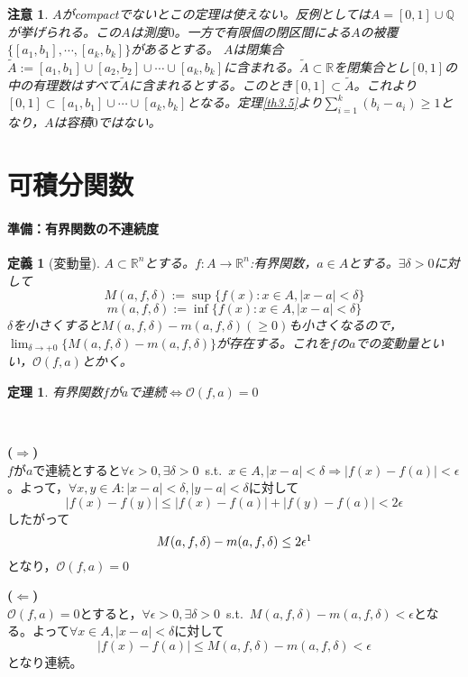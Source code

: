 \documentclass[dvipdfmx,a4j,10pt]{jsarticle}
\makeatletter
\theoremstyle{mystyle1}
\theoremstyle{mystyle2}
\newtheorem{dfn*}{定義}
\newtheorem{thm*}{定理}
\newtheorem{note}{注意}
\renewenvironment{proof}[1][\proofname]{\par
  \pushQED{\qed}%
  \normalfont
  \topsep6\p@\@plus6\p@ \trivlist
  \item[\hskip\labelsep{\bfseries\sffamily #1}]\ignorespaces
}{%
  \popQED\endtrivlist\@endpefalse
}
\renewcommand\proofname{証明}
\makeatother
\begin{document}
\begin{note}
	$A$がcompactでないとこの定理は使えない。反例としては$A=[0,1]\cup\mathbb{Q}$が挙げられる。この$A$は測度$0$。一方で有限個の閉区間による$A$の被覆$\{[a_1,b_1],\cdots,[a_k,b_k]\}$があるとする。
	$A$は閉集合$\tilde{A}:=[a_1,b_1]\cup[a_2,b_2]\cup\cdots\cup[a_k,b_k]$に含まれる。$\tilde{A}\subset\mathbb{R}$を閉集合とし$[0,1]$の中の有理数はすべて$\tilde{A}$に含まれるとする。このとき$[0,1]\subset\tilde{A}$。これより$[0,1]\subset[a_1,b_1]\cup\cdots\cup[a_k,b_k]$となる。定理\ref{th3.5}より$\displaystyle\sum_{i=1}^k(b_i-a_i)\geq 1$となり，$A$は容積$0$ではない。
\end{note}


\newpage


\section{可積分関数}
\paragraph{準備：有界関数の不連続度}
\begin{dfn*}[変動量]
$A\subset \mathbb{R}^n$とする。$f:A\to\mathbb{R}^n$:有界関数，$a\in A$とする。$\exists\delta>0$に対して
\[
	M(a,f,\delta):=\sup\{f(x):x\in A,|x-a|<\delta\}
\]
\[
	m(a,f,\delta):=\inf\{f(x):x\in A,|x-a|<\delta\}
\]
$\delta$を小さくすると$M(a,f,\delta)-m(a,f,\delta)(\geq 0)$も小さくなるので，$\displaystyle\lim_{\delta\to+0}\{M(a,f,\delta)-m(a,f,\delta)\}$が存在する。これを$f$の$a$での変動量といい，$\mathscr{O}(f,a)$とかく。
\end{dfn*}
\begin{thm*}
有界関数$f$が$a$で連続$\Leftrightarrow$$\mathscr{O}(f,a)=0$
\end{thm*}
\begin{proof}\
	\par\noindent\textbf{($\Rightarrow$)}\\
	$f$が$a$で連続とすると$\forall\epsilon>0,\exists\delta>0$\ s.t.\ $x\in A,|x-a|<\delta\Rightarrow|f(x)-f(a)|<\epsilon$。よって，$\forall x,y\in A:|x-a|<\delta,|y-a|<\delta$に対して
	\[
	|f(x)-f(y)|\leq |f(x)-f(a)|+|f(y)-f(a)|< 2\epsilon
	\]
	したがって
	\[
	M(a,f,\delta)-m(a,f,\delta)\leq 2\epsilon \footnotemark
	\]
	となり，$\mathscr{O}(f,a)=0$\\
	\par\noindent\textbf{($\Leftarrow$)}\\
	$\mathscr{O}(f,a)=0$とすると，$\forall\epsilon>0,\exists\delta>0$\ s.t.\ $M(a,f,\delta)-m(a,f,\delta)<\epsilon$となる。よって$\forall x\in A,|x-a|<\delta$に対して
	\[
		|f(x)-f(a)|\leq M(a,f,\delta)-m(a,f,\delta)<\epsilon
	\]
	となり連続。
\end{proof}
\end{document}
